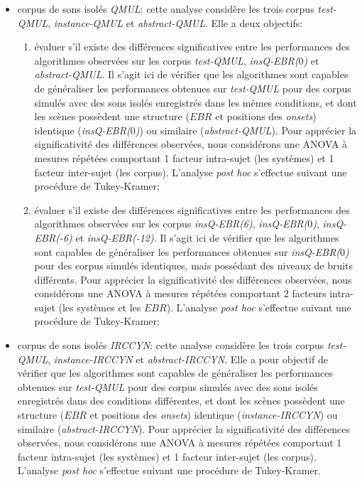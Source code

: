 \begin{itemize}

\item corpus de sons isolés \emph{QMUL}: cette analyse considère les trois corpus \emph{test-QMUL}, \emph{instance-QMUL} et \emph{abstract-QMUL}. Elle a deux objectifs:

\begin{enumerate}
\item évaluer s'il existe des différences significatives entre les performances des algorithmes observées sur les corpus \emph{test-QMUL}, \emph{insQ-EBR($0$)} et \emph{abstract-QMUL}. Il s'agit ici de vérifier que les algorithmes sont capables de généraliser les performances obtenues sur \emph{test-QMUL} pour des corpus simulés avec des sons isolés enregistrés dans les mêmes conditions, et dont les scènes possèdent une structure ($EBR$ et positions des \emph{onsets}) identique (\emph{insQ-EBR($0$)}) ou similaire (\emph{abstract-QMUL}). Pour apprécier la significativité des différences observées, nous considérons une ANOVA à mesures répétées comportant 1 facteur intra-sujet (les systèmes) et 1 facteur inter-sujet (les corpus). L'analyse \emph{post hoc} s'effectue suivant une procédure de Tukey-Kramer;

\item évaluer s'il existe des différences significatives entre les performances des algorithmes observées sur les corpus \emph{insQ-EBR(6)}, \emph{insQ-EBR($0$)}, \emph{insQ-EBR(-6)} et \emph{insQ-EBR(-12)}. Il s'agit ici de vérifier que les algorithmes sont capables de généraliser les performances obtenues sur \emph{insQ-EBR($0$)} pour des corpus simulés identiques, mais possédant des niveaux de bruits différents. Pour apprécier la significativité des différences observées, nous considérons une ANOVA à mesures répétées comportant 2 facteurs intra-sujet (les systèmes et les $EBR$). L'analyse \emph{post hoc} s'effectue suivant une procédure de Tukey-Kramer;

\end{enumerate}

\item corpus de sons isolés \emph{IRCCYN}: cette analyse considère les trois corpus \emph{test-QMUL}, \emph{instance-IRCCYN} et \emph{abstract-IRCCYN}. Elle a pour objectif de vérifier que les algorithmes sont capables de généraliser les performances obtenues sur \emph{test-QMUL} pour des corpus simulés avec des sons isolés enregistrés dans des conditions différentes, et dont les scènes possèdent une structure ($EBR$ et positions des \emph{onsets}) identique (\emph{instance-IRCCYN}) ou similaire (\emph{abstract-IRCCYN}). Pour apprécier la significativité des différences observées, nous considérons une ANOVA à mesures répétées comportant 1 facteur intra-sujet (les systèmes) et 1 facteur inter-sujet (les corpus). L'analyse \emph{post hoc} s'effectue suivant une procédure de Tukey-Kramer.

\end{itemize}

